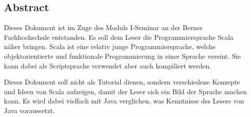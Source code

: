 \subsection*{Abstract}

Dieses Dokument ist im Zuge des Moduls I-Seminar an der Berner
Fachhochschule entstanden. Es soll dem Leser die Programmiersprache
Scala näher bringen. Scala ist eine relativ junge Programmiersprache,
welche objektorientierte und funktionale Programmierung in einer Sprache
vereint. Sie kann dabei als Scriptsprache verwendet aber auch kompiliert
werden.

Dieses Dokument soll nicht als Tutorial dienen, sondern
verschiedene Konzepte und Ideen von Scala aufzeigen, damit der Leser
sich ein Bild der Sprache machen kann. Es wird dabei vielfach
mit Java verglichen, was Kenntnisse des Lesers von Java voraussetzt.

